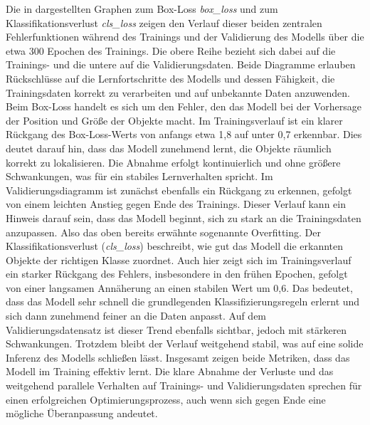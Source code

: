 Die in  dargestellten Graphen zum Box-Loss \textit{box\_loss} und zum Klassifikationsverlust \textit{cls\_loss} zeigen den Verlauf dieser beiden zentralen Fehlerfunktionen während des Trainings 
und der Validierung des Modells über die etwa 300 Epochen des Trainings. Die obere Reihe bezieht sich dabei auf die Trainings\hyp{} und die untere auf die Validierungsdaten.
Beide Diagramme erlauben Rückschlüsse auf die Lernfortschritte des Modells und dessen Fähigkeit, die Trainingsdaten korrekt zu verarbeiten und auf unbekannte Daten anzuwenden.
\newPar
Beim Box-Loss handelt es sich um den Fehler, den das Modell bei der Vorhersage der Position und Größe der Objekte macht. 
Im Trainingsverlauf ist ein klarer Rückgang des Box-Loss-Werts von anfangs etwa 1,8 auf unter 0,7 erkennbar. 
Dies deutet darauf hin, dass das Modell zunehmend lernt, die Objekte räumlich korrekt zu lokalisieren. 
Die Abnahme erfolgt kontinuierlich und ohne größere Schwankungen, was für ein stabiles Lernverhalten spricht. 
Im Validierungsdiagramm ist zunächst ebenfalls ein Rückgang zu erkennen, gefolgt von einem leichten Anstieg gegen Ende des Trainings. 
Dieser Verlauf kann ein Hinweis darauf sein, dass das Modell beginnt, sich zu stark an die Trainingsdaten anzupassen.
Also das oben bereits erwähnte sogenannte Overfitting.
\newPar
Der Klassifikationsverlust (\textit{cls\_loss}) beschreibt, wie gut das Modell die erkannten Objekte der richtigen Klasse zuordnet. 
Auch hier zeigt sich im Trainingsverlauf ein starker Rückgang des Fehlers, insbesondere in den frühen Epochen, gefolgt von einer langsamen Annäherung an einen stabilen Wert um 0,6. 
Das bedeutet, dass das Modell sehr schnell die grundlegenden Klassifizierungsregeln erlernt und sich dann zunehmend feiner an die Daten anpasst. 
Auf dem Validierungsdatensatz ist dieser Trend ebenfalls sichtbar, jedoch mit stärkeren Schwankungen. 
Trotzdem bleibt der Verlauf weitgehend stabil, was auf eine solide Inferenz des Modells schließen lässt.
\cite{yolo_metrics}
\newPar
Insgesamt zeigen beide Metriken, dass das Modell im Training effektiv lernt. 
Die klare Abnahme der Verluste und das weitgehend parallele Verhalten auf Trainings- und Validierungsdaten sprechen für einen erfolgreichen Optimierungsprozess, 
auch wenn sich gegen Ende eine mögliche Überanpassung andeutet.
